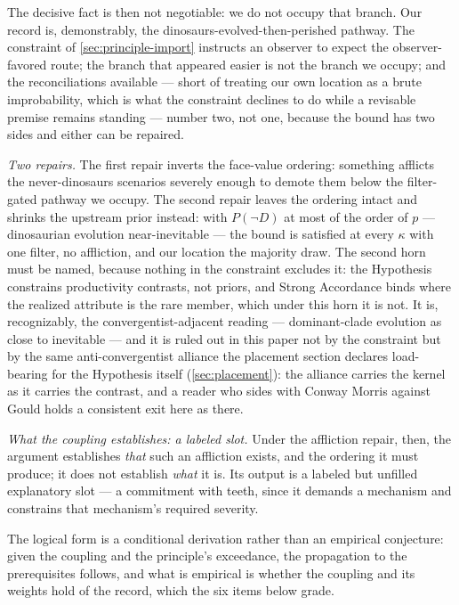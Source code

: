 \documentclass[11pt]{article}
\theoremstyle{definition}
\begin{document}
The decisive fact is then not negotiable: we do not occupy that branch. Our record is, demonstrably, the dinosaurs-evolved-then-perished pathway. The constraint of \autoref{sec:principle-import} instructs an observer to expect the observer-favored route; the branch that appeared easier is not the branch we occupy; and the reconciliations available --- short of treating our own location as a brute improbability, which is what the constraint declines to do while a revisable premise remains standing --- number two, not one, because the bound has two sides and either can be repaired.

\textit{Two repairs.} The first repair inverts the face-value ordering: something afflicts the never-dinosaurs scenarios severely enough to demote them below the filter-gated pathway we occupy. The second repair leaves the ordering intact and shrinks the upstream prior instead: with $P(\neg D)$ at most of the order of $p$ --- dinosaurian evolution near-inevitable --- the bound is satisfied at every $\kappa$ with one filter, no affliction, and our location the majority draw. The second horn must be named, because nothing in the constraint excludes it: the Hypothesis constrains productivity contrasts, not priors, and Strong Accordance binds where the realized attribute is the rare member, which under this horn it is not. It is, recognizably, the convergentist-adjacent reading --- dominant-clade evolution as close to inevitable --- and it is ruled out in this paper not by the constraint but by the same anti-convergentist alliance the placement section declares load-bearing for the Hypothesis itself (\autoref{sec:placement}): the alliance carries the kernel as it carries the contrast, and a reader who sides with Conway Morris against Gould holds a consistent exit here as there.



\textit{What the coupling establishes: a labeled slot.} Under the affliction repair, then, the argument establishes \emph{that} such an affliction exists, and the ordering it must produce; it does not establish \emph{what} it is. Its output is a labeled but unfilled explanatory slot --- a commitment with teeth, since it demands a mechanism and constrains that mechanism's required severity.

The logical form is a conditional derivation rather than an empirical conjecture: given the coupling and the principle's exceedance, the propagation to the prerequisites follows, and what is empirical is whether the coupling and its weights hold of the record, which the six items below grade.
\end{document}
